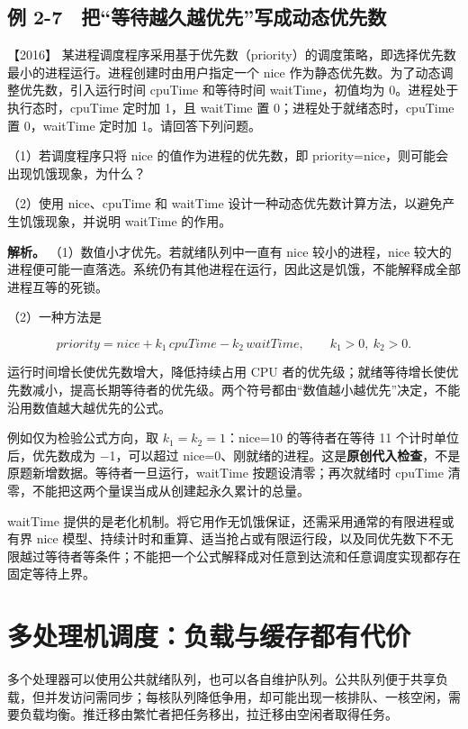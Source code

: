 \subsection{例 2-7　把``等待越久越优先''写成动态优先数}\label{os-ex2-7}

\noindent{}【2016】 某进程调度程序采用基于优先数（priority）的调度策略，即选择优先数最小的进程运行。进程创建时由用户指定一个 nice 作为静态优先数。为了动态调整优先数，引入运行时间 cpuTime 和等待时间 waitTime，初值均为 0。进程处于执行态时，cpuTime 定时加 1，且 waitTime 置 0；进程处于就绪态时，cpuTime 置 0，waitTime 定时加 1。请回答下列问题。

（1）若调度程序只将 nice 的值作为进程的优先数，即 priority=nice，则可能会出现饥饿现象，为什么？

（2）使用 nice、cpuTime 和 waitTime 设计一种动态优先数计算方法，以避免产生饥饿现象，并说明 waitTime 的作用。


\textbf{解析。} （1）数值小才优先。若就绪队列中一直有 nice 较小的进程，nice 较大的进程便可能一直落选。系统仍有其他进程在运行，因此这是饥饿，不能解释成全部进程互等的死锁。

（2）一种方法是

\[priority=nice+k_1\,cpuTime-k_2\,waitTime,\qquad k_1>0,\ k_2>0.\]

运行时间增长使优先数增大，降低持续占用 CPU 者的优先级；就绪等待增长使优先数减小，提高长期等待者的优先级。两个符号都由``数值越小越优先''决定，不能沿用数值越大越优先的公式。

例如仅为检验公式方向，取 \(k_1=k_2=1\)：nice=10 的等待者在等待 11 个计时单位后，优先数成为 −1，可以超过 nice=0、刚就绪的进程。这是\textbf{原创代入检查}，不是原题新增数据。等待者一旦运行，waitTime 按题设清零；再次就绪时 cpuTime 清零，不能把这两个量误当成从创建起永久累计的总量。

waitTime 提供的是老化机制。将它用作无饥饿保证，还需采用通常的有限进程或有界 nice 模型、持续计时和重算、适当抢占或有限运行段，以及同优先数下不无限越过等待者等条件；不能把一个公式解释成对任意到达流和任意调度实现都存在固定等待上界。

\section{多处理机调度：负载与缓存都有代价}\label{os-2-9}

多个处理器可以使用公共就绪队列，也可以各自维护队列。公共队列便于共享负载，但并发访问需同步；每核队列降低争用，却可能出现一核排队、一核空闲，需要负载均衡。推迁移由繁忙者把任务移出，拉迁移由空闲者取得任务。

